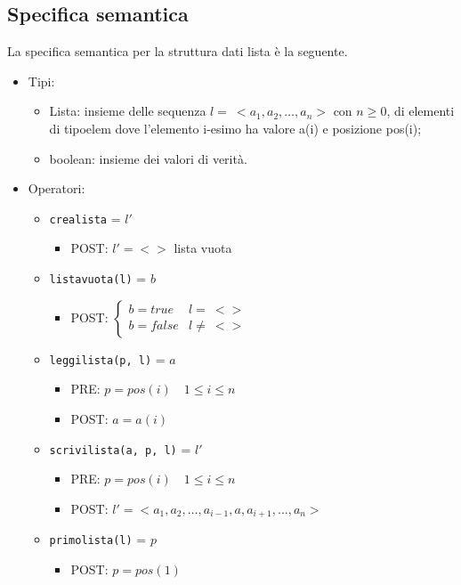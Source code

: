 \documentclass[12pt]{report}
\begin{document}
	\subsection{Specifica semantica}
	La specifica semantica per la struttura dati lista è la seguente.
	\begin{itemize}
		\item Tipi:
		\begin{itemize}
			\item Lista: insieme delle sequenza $l=\ <a_1, a_2, \dots, a_n>$ con $n \geq 0$, di elementi di tipoelem dove l'elemento i-esimo ha valore a(i) e posizione pos(i);
			\item boolean: insieme dei valori di verità.
		\end{itemize}
		\item Operatori:
		\begin{itemize}
			\item \texttt{crealista} = $l'$
			\begin{itemize}
				\item POST: $l' = <>$ lista vuota
			\end{itemize}
			\item \texttt{listavuota(l)} = $b$
			\begin{itemize}
				\item POST: $\begin{cases}
					b = true &  l =\ <> \\
					b = false & l \neq\ <>
				\end{cases}$
			\end{itemize}
			\item \texttt{leggilista(p, l)} = $a$
			\begin{itemize}
				\item PRE: $p = pos(i) \quad 1 \leq i \leq n$
				\item POST: $a = a(i)$
			\end{itemize}
			\item \texttt{scrivilista(a, p, l)} = $l'$
			\begin{itemize}
				\item PRE: $p = pos(i) \quad 1 \leq i \leq n$
				\item POST: $l' = <a_1, a_2, \dots, a_{i-1}, a, a_{i+1}, \dots, a_n>$
			\end{itemize}
			\item \texttt{primolista(l)} = $p$
			\begin{itemize}
				\item POST: $p = pos(1)$
			\end{itemize}

\end{itemize}
\end{itemize}
\end{document}
